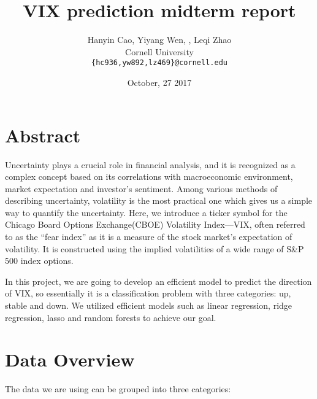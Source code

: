 \documentclass{article}
\title{VIX prediction midterm report}
\author{
  Hanyin Cao, Yiyang Wen, , Leqi Zhao \\
  Cornell University \\
  \texttt{\{hc936,yw892,lz469\}@cornell.edu} \\
}
\date{October, 27 2017}
\begin{document}
\maketitle

\section*{Abstract}

Uncertainty plays a crucial role in financial analysis, and it is recognized as a complex concept based on its correlations with macroeconomic environment, market expectation and investor's sentiment. Among various methods of describing uncertainty, volatility is the most practical one which gives us a simple way to quantify the uncertainty. Here, we introduce a ticker symbol for the Chicago Board Options Exchange(CBOE) Volatility Index—VIX, often referred to as the “fear index” as it is a measure of the stock market’s expectation of volatility. It is constructed using the implied volatilities of a wide range of S&P 500 index options.

In this project, we are going to develop an efficient model to predict the direction of VIX, so essentially it is a classification problem with three categories: up, stable and down. We utilized efficient models such as linear regression, ridge regression, lasso and random forests to achieve our goal. 

\section*{Data Overview}
The data we are using can be grouped into three categories:
\end{document}
